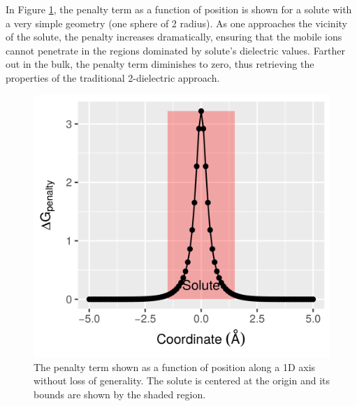 \documentclass[9pt,tutorial,pubversion]{livecoms}
\begin{document}
In Figure \ref{fig:plot_saltation_penalty}, the penalty term as a function of position is shown for a solute with a very simple geometry (one sphere of 2 \text{\AA} radius). As one approaches the vicinity of the solute, the penalty increases dramatically, ensuring that the mobile ions cannot penetrate in the regions dominated by solute’s dielectric values. Farther out in the bulk, the penalty term diminishes to zero, thus retrieving the properties of the traditional 2-dielectric approach.

\begin{figure}[hbt!]
\includegraphics[width=\linewidth]{Figure_2.png}
\caption{The penalty term shown as a function of position along a 1D axis without loss of generality. The solute is centered at the origin and its bounds are shown by the shaded region.}
\label{fig:plot_saltation_penalty}
\end{figure}
\end{document}
